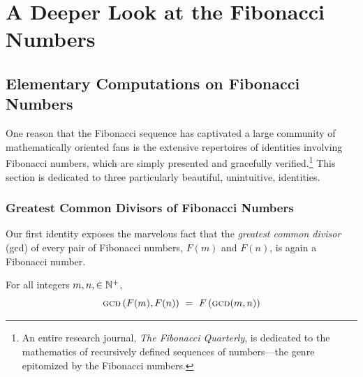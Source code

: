 
\chapter{A Deeper Look at the Fibonacci Numbers}
\label{ch:FIBO-enrich}

\noindent {}


\section{Elementary Computations on Fibonacci Numbers}
\label{sec:FIBO-enrich-ops}


One reason that the Fibonacci sequence has captivated a large community of mathematically oriented fans is the extensive repertoires of identities involving Fibonacci numbers, which are simply presented and gracefully verified.\footnote{An entire research journal, {\it The Fibonacci Quarterly}, is dedicated to the mathematics of recursively defined sequences of numbers---the genre epitomized by the Fibonacci numbers.}  This section is dedicated to three particularly beautiful,  unintuitive, identities.

\subsection{Greatest Common Divisors of Fibonacci Numbers}
\label{Appendix:FiboGCD}

Our first identity exposes the marvelous fact that the {\em greatest common divisor} ({\sc gcd}) of every pair of Fibonacci numbers, $F(m)$ and $F(n)$, is again a Fibonacci number.

\begin{prop}
For all integers $m, n, \in \mathbb{N}^+$,
\begin{equation}
\label{eq:fibo-gcd}
\mbox{\sc gcd} \left(F(m), F(n) \right) \ = \ F \left(\mbox{\sc gcd}(m, n) \right)
\end{equation}
\end{prop}


